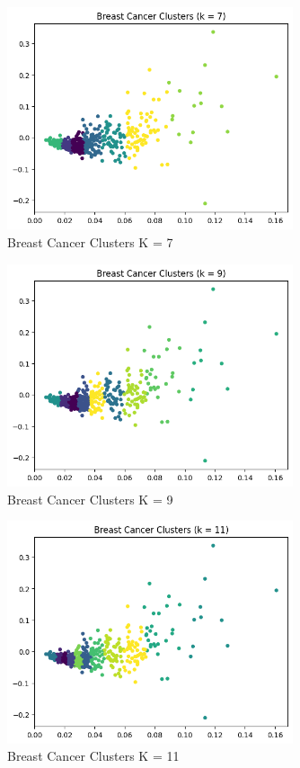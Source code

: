 \documentclass[12pt]{article}
\begin{document}
\begin{enumerate}
\begin{enumerate}
    \begin{figure}[H]
      \centering 
      \includegraphics[width=0.75\textwidth]{2_3_7.png}
      \caption{Breast Cancer Clusters K = 7}
    \end{figure}

    \begin{figure}[H]
      \centering 
      \includegraphics[width=0.75\textwidth]{2_3_9.png}
      \caption{Breast Cancer Clusters K = 9}
    \end{figure}

    \begin{figure}[H]
      \centering 
      \includegraphics[width=0.75\textwidth]{2_3_11.png}
      \caption{Breast Cancer Clusters K = 11}
    \end{figure}


  \end{enumerate}


\end{enumerate}

\end{document}
